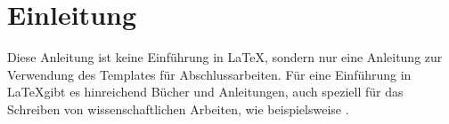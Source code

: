 %
\chapter{Einleitung}
Diese Anleitung ist keine Einführung in \LaTeX, sondern nur eine Anleitung zur Verwendung des Templates für Abschlussarbeiten. Für eine Einführung in \LaTeX gibt es hinreichend Bücher und Anleitungen, auch speziell für das Schreiben von wissenschaftlichen Arbeiten, wie beispielsweise \citep{schlosser2016wissenschaftliche}.
